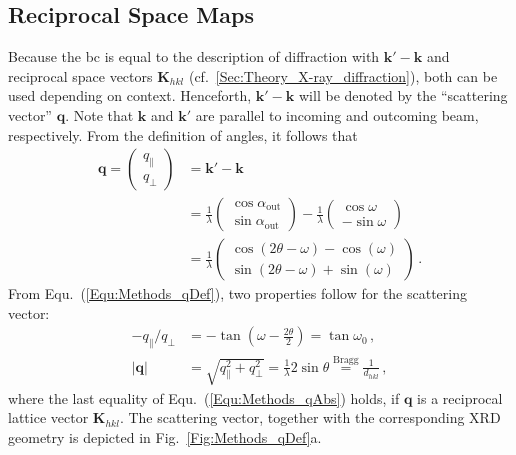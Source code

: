 \subsection{Reciprocal Space Maps}
    \label{Sec:Methods_RSM}
Because the \gls{bc} is equal to the description of diffraction with $\mathbf{k}'-\mathbf{k}$ and reciprocal space vectors $\mathbf{K}_{hkl}$ (cf.~\ref{Sec:Theory_X-ray_diffraction}), both can be used depending on context.
Henceforth, $\mathbf{k}'-\mathbf{k}$ will be denoted by the \enquote{scattering vector} $\mathbf{q}$.
Note that $\mathbf{k}$ and $\mathbf{k}'$ are parallel to incoming and outcoming beam, respectively.
From the definition of angles, it follows that
\begin{align}
    \mathbf{q}
    =\begin{pmatrix}
        q_\parallel\\
        q_\perp
    \end{pmatrix}
    &=\mathbf{k}'-\mathbf{k}\\
    &=\frac{1}{\lambda}
    \begin{pmatrix}
        \cos\alpha_\mathrm{out}\\
        \sin\alpha_\mathrm{out}
    \end{pmatrix}
    -\frac{1}{\lambda}
    \begin{pmatrix}
        \cos\omega\\
        -\sin\omega
    \end{pmatrix}\\
    &=\frac{1}{\lambda}
    \begin{pmatrix}
        \cos(2\theta-\omega)-\cos(\omega)\\
        \sin(2\theta-\omega)+\sin(\omega)
    \end{pmatrix}\,.
    \label{Equ:Methods_qDef}
\end{align}
From Equ.~(\ref{Equ:Methods_qDef}), two properties follow for the scattering vector:
\begin{align}
    -q_\parallel/q_\perp&=-\tan\left(\omega-\frac{2\theta}{2}\right)=\tan\omega_0
        \label{Equ:Methods_qDir}\,,\\
    \left|\mathbf{q}\right|&=\sqrt{q_\parallel^2+q_\perp^2}=\frac{1}{\lambda}2\sin\theta\overset{\mathrm{Bragg}}{=}\frac{1}{d_{hkl}}\,,
    \label{Equ:Methods_qAbs}
\end{align}
where the last equality of Equ.~(\ref{Equ:Methods_qAbs}) holds, if $\mathbf{q}$ is a reciprocal lattice vector $\mathbf{K}_{hkl}$.
The scattering vector, together with the corresponding \gls{XRD} geometry is depicted in Fig.~\ref{Fig:Methods_qDef}a.
